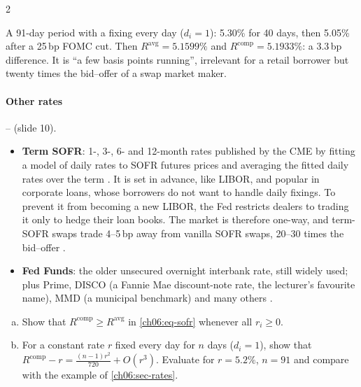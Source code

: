 \begin{paracol}{2}
\begin{example}
A 91-day period with a fixing every day ($d_i=1$): 5.30\% for 40 days, then 5.05\% after a 25\,bp FOMC cut.
Then $R^{\mathrm{avg}}=5.1599\%$ and $R^{\mathrm{comp}}=5.1933\%$: a 3.3\,bp difference. It is ``a few basis
points running'', irrelevant for a retail borrower but twenty times the bid--offer of a swap market maker.
\end{example}

\paragraph{Other rates} -- (slide 10).
\begin{itemize}
  \item \textbf{Term SOFR}: 1-, 3-, 6- and 12-month rates published by the CME by fitting a model of daily rates to
        SOFR futures prices and averaging the fitted daily rates over the term . It is set in
        advance, like LIBOR, and popular in corporate loans, whose borrowers do not want to handle daily
        fixings. To prevent it from becoming a new LIBOR, the Fed restricts dealers to trading it only to hedge
        their loan books. The market is therefore one-way, and term-SOFR swaps trade 4--5\,bp away from vanilla
        SOFR swaps, 20--30 times the bid--offer .
  \item \textbf{Fed Funds}: the older unsecured overnight interbank rate, still widely used; plus Prime,
        DISCO (a Fannie Mae discount-note rate, the lecturer's favourite name), MMD (a municipal benchmark) and many
        others .
\end{itemize}

\begin{exercise}\label{ch06:ex-sofr}
\leavevmode
\begin{enumerate}[(a)]
  \item Show that $R^{\mathrm{comp}}\ge R^{\mathrm{avg}}$ in \eqref{ch06:eq-sofr} whenever all $r_i\ge0$.
  \item For a constant rate $r$ fixed every day for $n$ days ($d_i=1$), show that
      $R^{\mathrm{comp}}-r=\frac{(n-1)r^2}{720}+O(r^3)$. Evaluate for $r=5.2\%$, $n=91$ and compare with the example of
      \cref{ch06:sec-rates}.
\end{enumerate}
\end{exercise}


\end{paracol}
